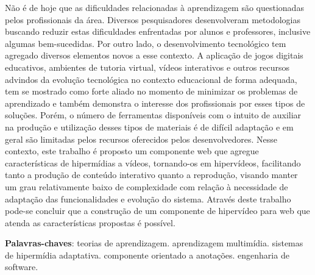 \begin{resumo}
Não é de hoje que as dificuldades relacionadas à aprendizagem são questionadas pelos profissionais da área. Diversos pesquisadores desenvolveram metodologias buscando reduzir estas dificuldades enfrentadas por alunos e professores, inclusive algumas bem-sucedidas. Por outro lado, o desenvolvimento tecnológico tem agregado diversos elementos novos a esse contexto. A aplicação de jogos digitais educativos, ambientes de tutoria virtual, vídeos interativos e outros recursos advindos da evolução tecnológica no contexto educacional de forma adequada, tem se mostrado como forte aliado no momento de minimizar os problemas de aprendizado e também demonstra o interesse dos profissionais por esses tipos de soluções. Porém, o número de ferramentas disponíveis com o intuito de auxiliar na produção e utilização desses tipos de materiais é de difícil adaptação e em geral são limitadas pelos recursos oferecidos pelos desenvolvedores. Nesse contexto, este trabalho é proposto um componente web que agregue  características de hipermídias a vídeos, tornando-os em hipervídeos, facilitando tanto a produção de conteúdo interativo quanto a reprodução, visando manter um grau relativamente baixo de complexidade com relação à necessidade de adaptação das funcionalidades e evolução do sistema. Através deste trabalho pode-se concluir que a construção de um componente de hipervídeo para web que atenda as características propostas é possível.
 \vspace{\onelineskip}
    
 \noindent
 \textbf{Palavras-chaves}: teorias de aprendizagem. aprendizagem multimídia. sistemas de hipermídia adaptativa. componente orientado a anotações. engenharia de software.
\end{resumo}
